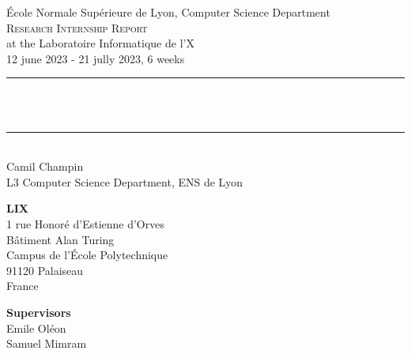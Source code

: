 \documentclass[a4paper]{report}
\makeatletter
\let\thetitle\@title
\makeatother
\begin{document}
\begin{titlepage}
  \begin{center}
        {\Large
        École Normale Supérieure de Lyon, Computer Science Department}\\[1.5 cm]
        \textsc{\LARGE Research Internship Report}
    \\[.5 cm]
    \large at the Laboratoire Informatique de l'X\\[.2 cm]
    12 june 2023 - 21 jully 2023, 6 weeks\\[1 cm]
    \rule{\linewidth}{0.2 mm} \\[1 cm]
    { \huge \bfseries \thetitle}\\[.7 cm]
    \rule{\linewidth}{0.2 mm} \\[1 cm]
        {\Large Camil Champin}\\[.2 cm]
        {\large L3 Computer Science Department, ENS de Lyon}\\[1 cm]
    \end{center}
    \begin{minipage}{0.5\textwidth}
      \begin{flushleft} \large
            \textbf{LIX}\\
            1 rue Honoré d'Estienne d'Orves\\
            Bâtiment Alan Turing\\
            Campus de l'École Polytechnique\\
            91120 Palaiseau\\
            France\\
        \end{flushleft}
      \end{minipage}
      \begin{minipage}{0.5\textwidth}
        \begin{flushright} \large
          \textbf{Supervisors} \\
            Emile Oléon\\
            Samuel Mimram\\
          \end{flushright}
        \end{minipage}\\[2 cm]
\end{titlepage}
\end{document}
